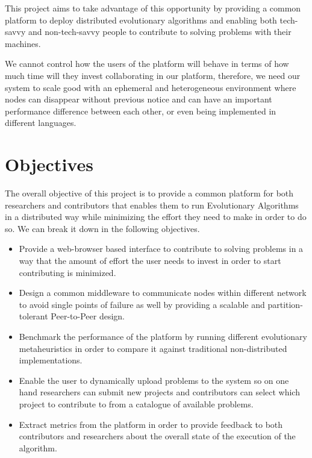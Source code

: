 This project aims to take advantage of this opportunity by providing a common platform to deploy distributed evolutionary algorithms and enabling both tech-savvy and non-tech-savvy people to contribute to solving problems with their machines.

We cannot control how the users of the platform will behave in terms of how much time will they invest collaborating in our platform, therefore, we need our system to scale good with an ephemeral and heterogeneous environment where nodes can disappear without previous notice and can have an important performance difference between each other, or even being implemented in different languages. 


\section{Objectives}
The overall objective of this project is to provide a common platform for both researchers and contributors that enables them to run Evolutionary Algorithms in a distributed way while minimizing the effort they need to make in order to do so. We can break it down in the following objectives.

\begin{itemize}
    \item Provide a web-browser based interface to contribute to solving problems in a way that the amount of effort the user needs to invest in order to start contributing is minimized.
    
    \item Design a common middleware to communicate nodes within different network to avoid single points of failure as well by providing a scalable and partition-tolerant Peer-to-Peer design.
    
    \item Benchmark the performance of the platform by running different evolutionary metaheuristics in order to compare it against traditional non-distributed implementations.
    
    \item Enable the user to dynamically upload problems to the system so on one hand researchers can submit new projects and contributors can select which project to contribute to from a catalogue of available problems.
    
    \item Extract metrics from the platform in order to provide feedback to both contributors and researchers about the overall state of the execution of the algorithm.
\end{itemize}
